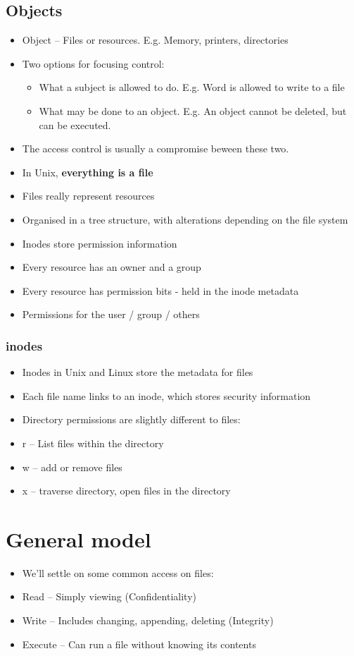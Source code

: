 \documentclass{article}
\begin{document}
\subsection{Objects}
\begin{itemize}
  \item Object – Files or resources. E.g. Memory, printers, directories 
  \item Two options for focusing control: 
  \begin{itemize}
    \item What a subject is allowed to do. E.g. Word is allowed to write to a file
    \item What may be done to an object. E.g. An object cannot be deleted, but can be executed.
  \end{itemize}
  \item The access control is usually a compromise beween these two.
  \item In Unix, \textbf{everything is a file} 
  \item Files really represent resources 
  \item Organised in a tree structure, with alterations depending on the file system 
  \item Inodes store permission information 
  \item Every resource has an owner and a group
  \item Every resource has permission bits - held in the inode metadata 
  \item Permissions for the user / group / others
\end{itemize}

\subsubsection{inodes}
\begin{itemize}
  \item Inodes in Unix and Linux store the metadata for files 
  \item Each file name links to an inode, which stores security information
  \item Directory permissions are slightly different to files: 
  \item r – List files within the directory 
  \item w – add or remove files 
  \item x – traverse directory, open files in the directory
\end{itemize}

\section{General model}
\begin{itemize}
  \item We’ll settle on some common access on files: 
  \item Read – Simply viewing (Confidentiality) 
  \item Write – Includes changing, appending, deleting (Integrity) 
  \item Execute – Can run a file without knowing its contents
\end{itemize}
\end{document}
